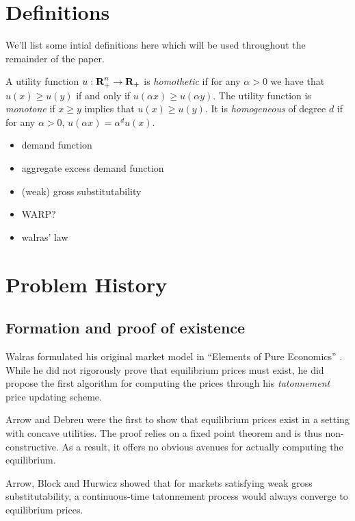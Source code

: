 \documentclass{article}
\begin{document}
\section{Definitions}
We'll list some intial definitions here which will be used throughout the remainder of the paper.

A utility function $u: {\mbox{\bf R}}^n_+ \to {\mbox{\bf R}}_+$ is \emph{homothetic} if for any $\alpha > 0$ we have that $u(x) \geq u(y)$ if and only if
$u(\alpha x) \geq u(\alpha y)$.
The utility function is \emph{monotone} if $x \geq y$ implies that $u(x) \geq u(y)$.
It is \emph{homogeneous} of degree $d$ if for any $\alpha > 0$,
$u(\alpha x) = \alpha^d u(x)$.

\begin{itemize}
\item demand function
\item aggregate excess demand function
\item (weak) gross substitutability
\item WARP?
\item walras' law
\end{itemize}



\section{Problem History}
\subsection{Formation and proof of existence}
Walras formulated his original market model in ``Elements of Pure Economics'' \cite{walras1896elements}. While he did not rigorously prove that equilibrium prices must exist, he did propose the first algorithm for computing the prices through his \emph{tatonnement} price updating scheme.

Arrow and Debreu \cite{arrow1954existence} were the first to show that equilibrium prices exist in a setting with concave utilities. The proof relies on a fixed point theorem and is thus non-constructive. As a result, it offers no obvious avenues for actually computing the equilibrium.

Arrow, Block and Hurwicz \cite{arrow1959stability} showed that for markets satisfying weak gross substitutability, a continuous-time tatonnement process would always converge to equilibrium prices.

\end{document}
